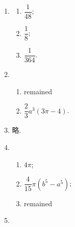 \documentclass[a4paper, 11pt]{ctexart}
\begin{document}
\begin{enumerate}
    \item %
        \begin{multicols}{3}
            \begin{enumerate}[(1)]
                \item %
                    $\dfrac{1}{48}$;
                \item %
                    $\dfrac{1}{8}$;
                \item %
                    $\dfrac{1}{364}$.
            \end{enumerate}
        \end{multicols}
    \item %
        \begin{enumerate}[(1)]
            \item %
                {\color{red}remained}
            \item %
                $\dfrac23a^3(3\pi - 4)$.
        \end{enumerate}
    \item %
        略.
    \item %
        \begin{enumerate}[(1)]
            \item %
                $4\pi$;
            \item %
                $\dfrac{4}{15}\pi(b^5 - a^5)$;
            \item %
                {\color{red}remained}
        \end{enumerate}
    \item %
\end{enumerate}
\end{document}
